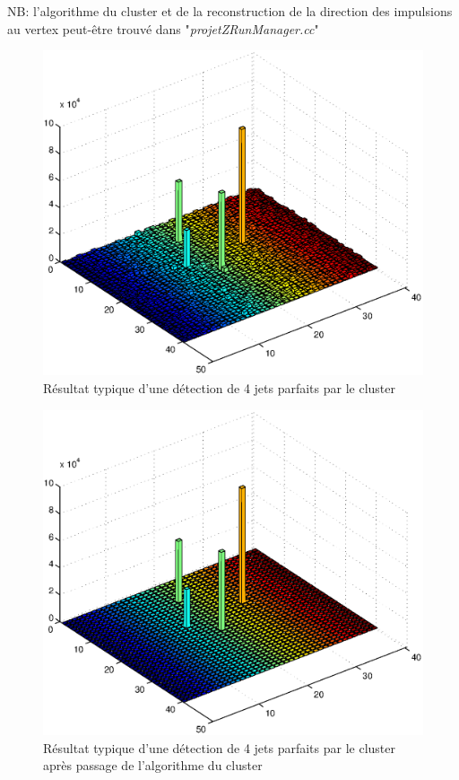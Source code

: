 \documentclass[11pt]{article}
\begin{document}
NB: l'algorithme du cluster et de la reconstruction de la direction des
impulsions au vertex peut-être trouvé dans "\textit{projetZRunManager.cc}"

\begin{figure}
\caption{Résultat typique d'une détection de 4 jets parfaits par le cluster}
\includegraphics{images/bonCasBrut.eps}
\end{figure}
\begin{figure}
\caption{Résultat typique d'une détection de 4 jets parfaits par le cluster
après passage de l'algorithme du cluster}
\includegraphics{images/bonCasNet.eps}
\end{figure}
\end{document}
